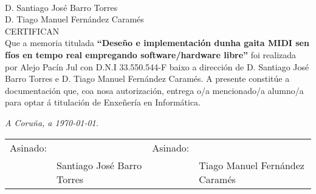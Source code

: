 \thispagestyle{empty}
\mbox{}\\[4cm]
\noindent D. Santiago José Barro Torres \\[1cm]
\noindent D. Tiago Manuel Fernández Caramés \\[1cm]
\textsc{CERTIFICAN}\\[1.5cm]
\indent Que a memoria titulada \textbf{``Deseño e implementación dunha gaita
MIDI sen fíos en tempo real empregando software/hardware libre''} foi realizada
por Alejo Pacín Jul con D.N.I 33.550.544-F baixo a dirección de D.
Santiago José Barro Torres e D. Tiago Manuel Fernández Caramés. A presente
constitúe a documentación que, coa nosa autorización, entrega o/a mencionado/a
alumno/a para optar á titulación de Enxeñería en Informática.
\vfill
\begin{flushright}
\emph{A Coruña, a \today{}.} \\[2cm]
\begin{tabular}{llll}
Asinado: & & Asinado:\\
         & Santiago José Barro Torres & & Tiago Manuel Fernández Caramés \\
\end{tabular}
\end{flushright}